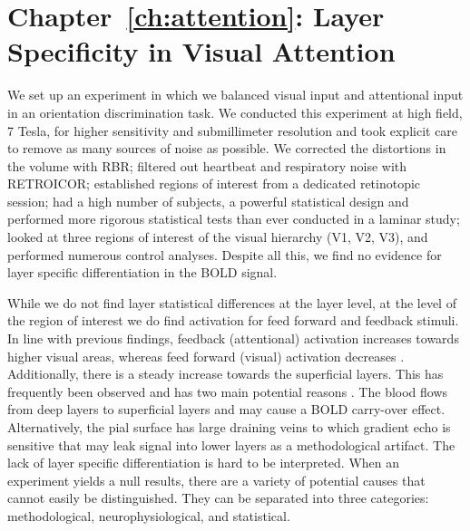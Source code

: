 \section*{Chapter~\ref{ch:attention}: Layer Specificity in Visual Attention}
We set up an experiment in which we balanced visual input and attentional input in an orientation discrimination task. We conducted this experiment at high field, 7 Tesla, for higher sensitivity and submillimeter resolution and took explicit care to remove as many sources of noise as possible. We corrected the distortions in the volume with RBR; filtered out heartbeat and respiratory noise with RETROICOR; established regions of interest from a dedicated retinotopic session; had a high number of subjects, a powerful statistical design and performed more rigorous statistical tests than ever conducted in a laminar study; looked at three regions of interest of the visual hierarchy (V1, V2, V3), and performed numerous control analyses. Despite all this, we find no evidence for layer specific differentiation in the BOLD signal.

While we do not find layer statistical differences at the layer level, at the level of the region of interest we do find activation for feed forward and feedback stimuli. In line with previous findings, feedback (attentional) activation increases towards higher visual areas, whereas feed forward (visual) activation decreases \cite{Murray2008,Jehee2011}. Additionally, there is a steady increase towards the superficial layers. This has frequently been observed and has two main potential reasons \cite{Koopmans2010,Polimeni2010}. The blood flows from deep layers to superficial layers and may cause a BOLD carry-over effect. Alternatively, the pial surface has large draining veins to which gradient echo is sensitive that may leak signal into lower layers as a methodological artifact. The lack of layer specific differentiation is hard to be interpreted. When an experiment yields a null results, there are a variety of potential causes that cannot easily be distinguished. They can be separated into three categories: methodological, neurophysiological, and statistical.

